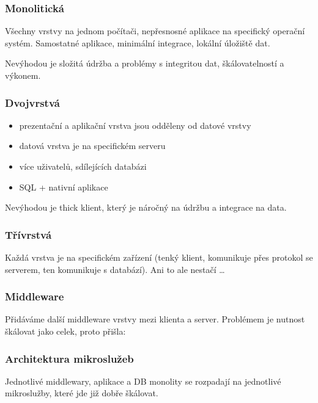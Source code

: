 \subsubsection*{Monolitická}

Všechny vrstvy na jednom počítači, nepřesnosné aplikace na specifický operační systém. Samostatné aplikace, minimální integrace, lokální úložiště dat.

\vspace{4pt}
\noindent Nevýhodou je složitá údržba a problémy s integritou dat, škálovatelností a výkonem.

\subsubsection*{Dvojvrstvá}

\begin{itemize}
    \item prezentační a aplikační vrstva jsou odděleny od datové vrstvy
    \item datová vrstva je na specifickém serveru
    \item více uživatelů, sdílejících databázi
    \item SQL + nativní aplikace
\end{itemize}

\noindent Nevýhodou je thick klient, který je náročný na údržbu a integrace na data.

\subsubsection*{Třívrstvá}

Každá vrstva je na specifickém zařízení (tenký klient, komunikuje přes protokol se serverem, ten komunikuje s databází). Ani to ale nestačí \ldots

\subsubsection*{Middleware}

Přidáváme další middleware vrstvy mezi klienta a server. Problémem je nutnost škálovat jako celek, proto přišla:

\subsubsection*{Architektura mikroslužeb}

Jednotlivé middlewary, aplikace a DB monolity se rozpadají na jednotlivé mikroslužby, které jde již dobře škálovat.

